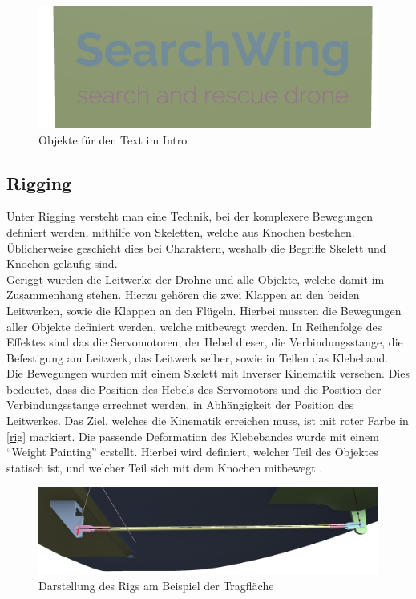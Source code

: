 \begin{figure}[H]
\begin{center}
\includegraphics[width=\textwidth]{gfx/prod/env/intro_text.jpg}
\caption{Objekte für den Text im Intro}
\label{intro_text}
\end{center}
\end{figure}

\subsection{Rigging}

Unter Rigging versteht man eine Technik, bei der komplexere Bewegungen definiert werden, mithilfe von Skeletten, welche aus Knochen bestehen. Üblicherweise geschieht dies bei Charaktern, weshalb die Begriffe Skelett und Knochen geläufig sind. \\
Geriggt wurden die Leitwerke der Drohne und alle Objekte, welche damit im Zusammenhang stehen. 
Hierzu gehören die zwei Klappen an den beiden Leitwerken, sowie die Klappen an den Flügeln. Hierbei mussten die Bewegungen aller Objekte definiert werden, welche mitbewegt werden. In Reihenfolge des Effektes sind das die Servomotoren, der Hebel dieser, die Verbindungsstange, die Befestigung am Leitwerk, das Leitwerk selber, sowie in Teilen das Klebeband.\\
Die Bewegungen wurden mit einem Skelett mit Inverser Kinematik versehen. Dies bedeutet, dass die Position des Hebels des Servomotors und die Position der Verbindungsstange errechnet werden, in Abhängigkeit der Position des Leitwerkes. Das Ziel, welches die Kinematik erreichen muss, ist mit roter Farbe in \autoref{rig} markiert. Die passende Deformation des Klebebandes wurde mit einem ``Weight Painting'' erstellt. Hierbei wird definiert, welcher Teil des Objektes statisch ist, und welcher Teil sich mit dem Knochen mitbewegt .

\begin{figure}[H]
\begin{center}
\includegraphics[width=\textwidth]{gfx/prod/plane/plane7.jpg}
\caption{Darstellung des Rigs am Beispiel der Tragfläche}
\label{rig}
\end{center}
\end{figure}

